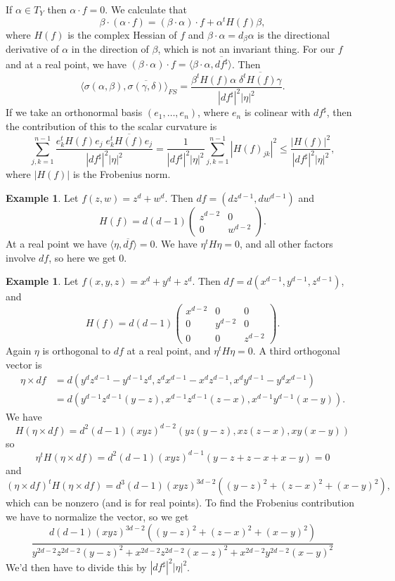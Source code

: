 \documentclass[11pt]{amsart}
\theoremstyle{definition}
\newtheorem{exam}[theo]{Example}
\def\ov#1{\overline{#1}}
\begin{document}
If $\alpha \in T_{Y}$ then $\alpha \cdot f = 0$. We calculate that
\[
  \beta \cdot (\alpha \cdot f)
  = (\beta \cdot \alpha) \cdot f
  + \alpha^{t} H(f) \beta,
\]
where $H(f)$ is the complex Hessian of $f$ and
$\beta \cdot \alpha = d_{\beta}\alpha$ is the directional derivative of $\alpha$
in the direction of $\beta$, which is not an invariant thing.
For our $f$ and at a real point, we have $(\beta \cdot \alpha) \cdot f = \langle \beta \cdot \alpha, \ov{df^{\sharp}} \rangle$.
Then
\[
  \langle \sigma(\alpha, \beta), \ov{\sigma(\gamma, \delta)} \rangle_{FS}
  = \frac{\beta^{t}H(f)\alpha \; \ov{\delta^{t}H(f)\gamma}}
  {|df^{\sharp}|^{2}|\eta|^{2}}.
\]
If we take an orthonormal basis $(e_{1}, \ldots, e_{n})$, where $e_{n}$ is colinear with $df^{\sharp}$, then the contribution of this to the scalar curvature is
\[
  \sum_{j,k=1}^{n-1} \frac{e_{k}^{t}H(f)e_{j} \; \ov{e_{k}^{t}H(f)e_{j}}}
  {|df^{\sharp}|^{2}|\eta|^{2}}
 = \frac{1}{|df^{\sharp}|^{2}|\eta|^{2}}
 \sum_{j,k=1}^{n-1} |H(f)_{jk}|^{2}
 \leq \frac{|H(f)|^{2}}{|df^{\sharp}|^{2}|\eta|^{2}},
\]
where $|H(f)|$ is the Frobenius norm.


\begin{exam}
Let $f(z,w) = z^{d} + w^{d}$.
Then $df = (dz^{d-1}, dw^{d-1})$ and
\[
H(f) =
d(d-1)
\begin{pmatrix}
z^{d-2} & 0
\\
0 & w^{d-2}
\end{pmatrix}.
\]
At a real point we have $\langle \eta, \ov{df} \rangle = 0$.
We have $\eta^{t}H\eta = 0$, and all other factors involve $df$, so here we get $0$.
\end{exam}



\begin{exam}
Let $f(x,y,z) = x^{d} + y^{d} + z^{d}$.
Then $df = d(x^{d-1}, y^{d-1}, z^{d-1})$, and
\[
H(f) =
d(d-1)
\begin{pmatrix}
x^{d-2} & 0 & 0
\\
0 & y^{d-2} & 0
\\
0 & 0 & z^{d-2}
\end{pmatrix}.
\]
Again $\eta$ is orthogonal to $df$ at a real point, and $\eta^{t}H\eta = 0$.
A third orthogonal vector is
\begin{align*}
  \eta \times df
  &= d(
  y^{d}z^{d-1} - y^{d-1}z^{d} ,
  z^{d}x^{d-1} - x^{d}z^{d-1} ,
  x^{d}y^{d-1} - y^{d}x^{d-1}
  )
  \\
  &= d(
  y^{d-1}z^{d-1}(y - z),
  x^{d-1}z^{d-1}(z - x),
  x^{d-1}y^{d-1}(x - y)
  ).
\end{align*}
We have
\[
  H (\eta \times df)
  = d^{2}(d-1)(xyz)^{d-2}(
  yz(y-z), xz(z-x), xy(x-y)
  )
\]
so
\[
  \eta^{t} H (\eta \times df)
  = d^{2}(d-1)(xyz)^{d-1}
  (y-z + z - x + x - y)
  = 0
\]
and
\[
  (\eta \times df)^{t} H (\eta \times df)
  = d^{3}(d-1) (xyz)^{3d-2}
  (
  (y-z)^{2} + (z-x)^{2} + (x-y)^{2}
  ),
\]
which can be nonzero (and is for real points).
To find the Frobenius contribution we have to normalize the vector, so we get
\[
  \frac{d(d-1) (xyz)^{3d-2}
  (
  (y-z)^{2} + (z-x)^{2} + (x-y)^{2}
  )}{
  y^{2d-2}z^{2d-2}(y-z)^{2}
  + x^{2d-2}z^{2d-2}(x-z)^{2}
  + x^{2d-2}y^{2d-2}(x-y)^{2}
}
\]
We'd then have to divide this by $|df^{\sharp}|^{2}|\eta|^{2}$.
\end{exam}
\end{document}
